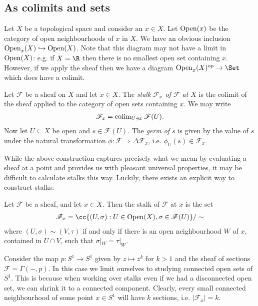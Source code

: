 \documentclass{article}
\begin{document}
\subsection{As colimits and sets}

Let $X$ be a topological space and consider an $x\in X$. Let
$\operatorname{Open}(x)$ be the category of open neighbourhoods of $x$ in $X$.
We have an obvious inclusion $\operatorname{Open}_x(X)\hookrightarrow\operatorname{Open}(X)$.
Note that this diagram may not have a limit in $\operatorname{Open}(X)$:
e.g. if $X=\R$ then there is no smallest open set containing
$x$. However, if we apply the sheaf then we have a diagram
$\Open_x(X)^\text{op}\to\Set$ which does have a colimit.

\begin{definition}
  Let $\mathscr F$ be a sheaf on $X$ and let $x\in X$.
  The \emph{stalk $\mathscr F_x$ of $\mathscr F$ at $X$} is the
  colimit of the sheaf applied to the category of open sets containing $x$.
  We may write
  \begin{align*}
    \mathscr F_x = \operatorname{colim}_{U\ni x} \mathscr F(U).
  \end{align*}
  Now let $U\subseteq X$ be open and $s\in\mathscr F(U)$.
  The \emph{germ of $s$} is given by the value of $s$ under the
  natural transformation $\phi:\mathscr F\Rightarrow\Delta\mathscr F_x$,
  i.e. $\phi_U(s)\in\mathscr F_x$.
\end{definition}

While the above construction captures precisely what we mean by
evaluating a sheaf at a point and provides us with pleasant universal
properties, it may be difficult to calculate stalks this way. Luckily,
there exists an explicit way to construct stalks:

\begin{proposition}
  Let $\mathscr F$ be a sheaf, and let $x \in X$. Then the stalk of $\mathscr F$
  at $x$ is the set
  \begin{align*}
    \mathscr F_x = \cc{(U, \sigma) : U \in \Open(X), \sigma \in \mathscr F(U)} / \sim
  \end{align*}
  where $(U, \sigma) \sim (V, \tau)$ if and only if there is an open neighbourhood
  $W$ of $x$, contained in $U \cap V$, such that $\sigma|_W = \tau|_W$.
\end{proposition}

\begin{example}
  Consider the map $p:S^1\to S^1$ given by $z\mapsto z^k$ for $k > 1$ and the
  sheaf of sections $\mathscr F = \Gamma(-, p)$. In this case we limit
  ourselves to studying connected open sets of $S^1$. This is because when
  working over stalks even if we had a disconnected open set, we can shrink it
  to a connected component. Clearly, every small connected neighbourhood of
  some point $x \in S^1$ will have $k$ sections, i.e. $|\mathscr F_x| = k$.
\end{example}
\end{document}
